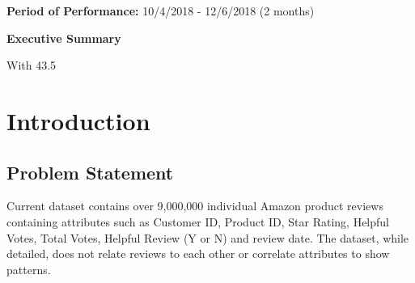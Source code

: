 \documentclass[12pt]{article}
\begin{document}
\begin{flushleft}

	\item{\bfseries Period of Performance:} 10/4/2018 - 12/6/2018 (2 months)\\[48pt]

	\begin{center}
		\Large{\bfseries Executive Summary }\\[11pt]
	\end{center}

\end{flushleft}

With 43.5%


\newpage\tableofcontents


\newpage
{}
\clearpage
\setcounter{page}{1}

\section{Introduction}

	\subsection{Problem Statement}\hspace{4ex} Current dataset contains over 9,000,000 individual Amazon product reviews containing attributes such as Customer ID, Product ID, Star Rating, Helpful Votes, Total Votes, Helpful Review (Y or N) and review date. The dataset, while detailed, does not relate reviews to each other or correlate attributes to show patterns.   
	
	
\end{document}
